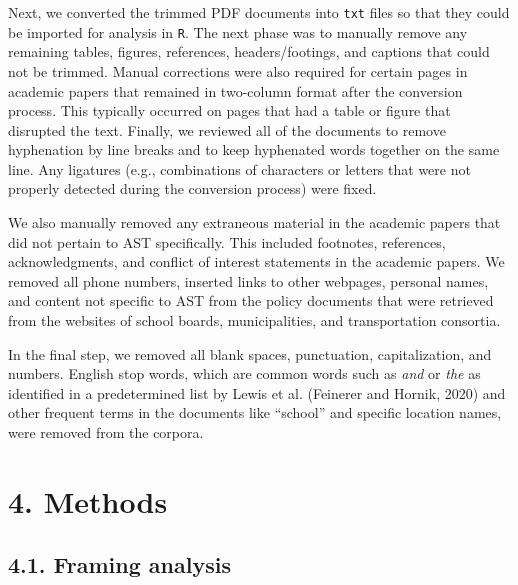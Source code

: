 \documentclass[]{elsarticle} %
\begin{document}
Next, we converted the trimmed PDF documents into \texttt{txt} files so
that they could be imported for analysis in \texttt{R}. The next phase
was to manually remove any remaining tables, figures, references,
headers/footings, and captions that could not be trimmed. Manual
corrections were also required for certain pages in academic papers that
remained in two-column format after the conversion process. This
typically occurred on pages that had a table or figure that disrupted
the text. Finally, we reviewed all of the documents to remove
hyphenation by line breaks and to keep hyphenated words together on the
same line. Any ligatures (e.g., combinations of characters or letters
that were not properly detected during the conversion process) were
fixed.

We also manually removed any extraneous material in the academic papers
that did not pertain to AST specifically. This included footnotes,
references, acknowledgments, and conflict of interest statements in the
academic papers. We removed all phone numbers, inserted links to other
webpages, personal names, and content not specific to AST from the
policy documents that were retrieved from the websites of school boards,
municipalities, and transportation consortia.

In the final step, we removed all blank spaces, punctuation,
capitalization, and numbers. English stop words, which are common words
such as \emph{and} or \emph{the} as identified in a predetermined list
by Lewis et al. (Feinerer and Hornik, 2020) and other frequent terms in
the documents like ``school'' and specific location names, were removed
from the corpora.

\hypertarget{methods}{%
\section{4. Methods}\label{methods}}

\hypertarget{framing-analysis}{%
\subsection{4.1. Framing analysis}\label{framing-analysis}}
\end{document}
